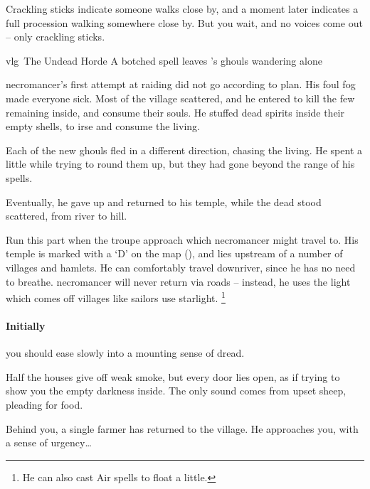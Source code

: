 \begin{boxtext}
  Crackling sticks indicate someone walks close by, and a moment later indicates a full procession walking somewhere close by.
  But you wait, and no voices come out -- only crackling sticks.
\end{boxtext}

{\gls{vlg}~The Undead Horde}%
{A botched spell leaves 's ghouls wandering alone}%
\label{necroHorde}

\begin{exampletext}
  \Gls{necromancer}'s first attempt at raiding  did not go according to plan.
  His foul fog made everyone sick.
  Most of the \gls{village} scattered, and he entered to kill the few remaining inside, and consume their souls.
  He stuffed dead spirits inside their empty shells, to irse and consume the living.

  Each of the new ghouls fled in a different direction, chasing the living.
  He spent a little while trying to round them up, but they had gone beyond the range of his spells.

  Eventually, he gave up and returned to his temple, while the dead stood scattered, from river to hill.
\end{exampletext}

Run this part when the troupe approach  which \gls{necromancer} might travel to.
His temple is marked with a `\gls{D}' on the map (), and lies upstream of a number of \glspl{village} and hamlets.
He can comfortably travel downriver, since he has no need to breathe.%
\Gls{necromancer} will never return via roads -- instead, he uses the light which comes off \glspl{village} like sailors use starlight.
\footnote{He can also cast Air spells to float a little.}

\paragraph{Initially}
you should ease slowly into a mounting sense of dread.

\begin{boxtext}
  Half the houses give off weak smoke, but every door lies open, as if trying to show you the empty darkness inside.
  The only sound comes from upset sheep, pleading for food.

  Behind you, a single farmer has returned to the \gls{village}.
  He approaches you, with a sense of urgency\ldots
\end{boxtext}

